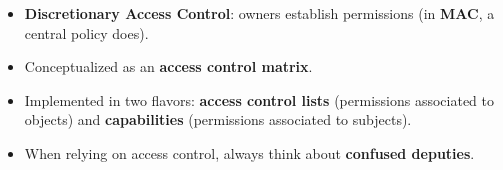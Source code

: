 \begin{keybox}[title=Summary]
\begin{itemize}
  \item \textbf{Discretionary Access Control}: owners establish permissions (in
        \textbf{MAC}, a central policy does).
  \item Conceptualized as an \textbf{access control matrix}.
  \item Implemented in two flavors: \textbf{access control lists} (permissions
        associated to objects) and \textbf{capabilities} (permissions associated to
        subjects).
  \item When relying on access control, always think about \textbf{confused deputies}.
\end{itemize}
\end{keybox}
